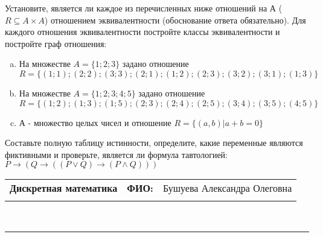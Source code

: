 \documentclass[10pt]{exam}
\newcommand{\class}{Дискретная математика}
\newcommand{\examdate}{}
\begin{document}
\begin{questions}
\question
Установите, является ли каждое из перечисленных ниже отношений на А ($R \subseteq A \times A$) отношением эквивалентности (обоснование ответа обязательно). Для каждого отношения эквивалентности постройте классы 
эквивалентности и постройте граф отношения:
\begin{enumerate} [a)]\setcounter{enumi}{0}
\item На множестве $A = \{1; 2; 3\}$ задано отношение $R = \{(1; 1); (2; 2); (3; 3); (2; 1); (1; 2); (2; 3); (3; 2); (3; 1); (1; 3)\}$
\item На множестве $A = \{1; 2; 3; 4; 5\}$ задано отношение $R = \{(1; 2); (1; 3); (1; 5); (2; 3); (2; 4); (2; 5); (3; 4); (3; 5); (4; 5)\}$
\item А - множество целых чисел и отношение $R = \{(a,b)|a + b = 0\}$
\end{enumerate}\question Составьте полную таблицу истинности, определите, какие переменные являются фиктивными и проверьте, является ли формула тавтологией:
$ P \rightarrow (Q \rightarrow ((P \lor Q) \rightarrow (P \land Q)))$

\end{questions}
\newpage
\begin{flushright}
\begin{tabular}{p{2.8in} r l}
\textbf{\class} & \textbf{ФИО:} &Бушуева Александра Олеговна
\\

\textbf{\examdate} &&\\
\end{tabular}\\
\end{flushright}
\rule[1ex]{\textwidth}{.1pt}
\end{document}
